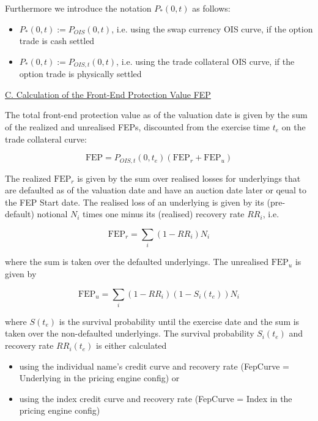 Furthermore we introduce the notation $P_{*}(0,t)$ as follows:

\begin{itemize}
\item $P_{*}(0,t) := P_{OIS}(0,t)$, i.e. using the swap currency OIS curve, if the option trade is cash settled
\item $P_{*}(0,t) := P_{OIS,t}(0,t)$, i.e. using the trade collateral OIS curve, if the option trade is physically settled
\end{itemize}

\underline{C. Calculation of the Front-End Protection Value FEP}

The total front-end protection value as of the valuation date is given by the sum of the realized and unrealised FEPs,
discounted from the exercise time $t_e$ on the trade collateral curve:

\begin{equation}
\text{FEP} = P_{OIS,t}(0,t_e) ( \text{FEP}_r + \text{FEP}_u )
\end{equation}

The realized $\text{FEP}_r$ is given by the sum over realised losses for underlyings that are defaulted as of the valuation
date and have an auction date later or qeual to the FEP Start date. The realised loss of an underlying is given by its
(pre-default) notional $N_i$ times one minus its (realised) recovery rate $RR_i$, i.e.

\begin{equation}
\text{FEP}_r = \sum_i (1-RR_i) N_i
\end{equation}

where the sum is taken over the defaulted underlyings. The unrealised $\text{FEP}_u$ is given by

\begin{equation}
\text{FEP}_u = \sum_i (1-RR_i) (1 - S_i(t_e)) N_i
\end{equation}

where $S(t_e)$ is the survival probability until the exercise date and the sum is taken over the non-defaulted
underlyings. The survival probability $S_i(t_e)$ and recovery rate $RR_i(t_e)$ is either calculated

\begin{itemize}
\item using the individual name's credit curve and recovery rate (FepCurve = Underlying in the pricing engine config) or
\item using the index credit curve and recovery rate (FepCurve = Index in the pricing engine config)
\end{itemize}

